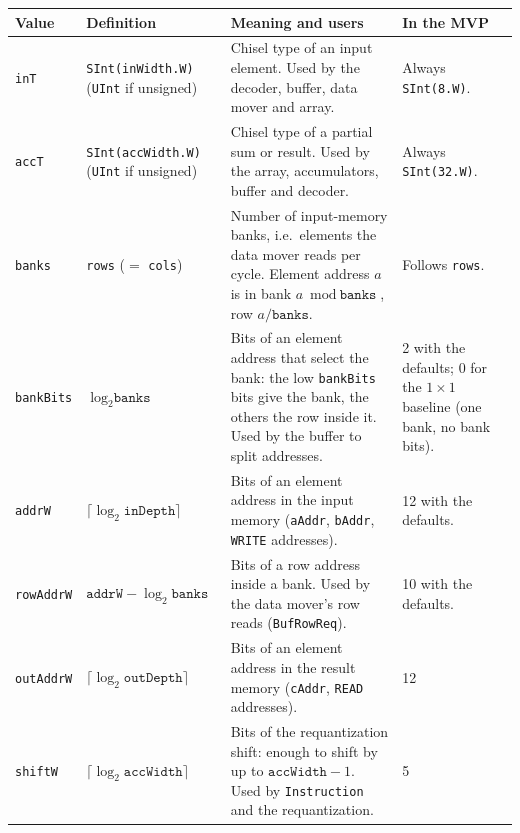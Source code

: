 \documentclass{article}
\begin{document}
\begin{table}[htbp]
\small\renewcommand{\arraystretch}{1.25}
\begin{tabularx}{\linewidth}{@{} l >{\raggedright\arraybackslash}p{3.3cm} Y Y @{}}
  \toprule
  \textbf{Value} & \textbf{Definition} & \textbf{Meaning and users} & \textbf{In the MVP} \\
  \midrule
  \texttt{inT}  & \texttt{SInt(inWidth.W)} (\texttt{UInt} if unsigned)
                & Chisel type of an input element. Used by the decoder, buffer, data mover and array.
                & Always \texttt{SInt(8.W)}. \\
  \texttt{accT} & \texttt{SInt(accWidth.W)} (\texttt{UInt} if unsigned)
                & Chisel type of a partial sum or result. Used by the array, accumulators, buffer and decoder.
                & Always \texttt{SInt(32.W)}. \\
  \texttt{banks} & \texttt{rows} ($=$ \texttt{cols})
                & Number of input-memory banks, i.e.\ elements the data mover reads per cycle. Element address $a$ is in bank $a \bmod \texttt{banks}$, row $a / \texttt{banks}$.
                & Follows \texttt{rows}. \\
\texttt{bankBits} & $\log_2 \texttt{banks}$
                & Bits of an element address that select the bank: the low \texttt{bankBits} bits give the bank,
                  the others the row inside it. Used by the buffer to split addresses.
                & 2 with the defaults; 0 for the $1\times1$ baseline (one bank, no bank bits). \\
  \texttt{addrW} & $\lceil\log_2 \texttt{inDepth}\rceil$
                & Bits of an element address in the input memory (\texttt{aAddr}, \texttt{bAddr}, \texttt{WRITE} addresses).
                & 12 with the defaults. \\
  \texttt{rowAddrW} & $\texttt{addrW} - \log_2 \texttt{banks}$
                & Bits of a row address inside a bank. Used by the data mover's row reads (\texttt{BufRowReq}).
                & 10 with the defaults. \\
\texttt{outAddrW} & $\lceil\log_2 \texttt{outDepth}\rceil$
                & Bits of an element address in the result memory (\texttt{cAddr}, \texttt{READ} addresses).
                & 12 \\
  \texttt{shiftW} & $\lceil\log_2 \texttt{accWidth}\rceil$
                & Bits of the requantization shift: enough to shift by up to $\texttt{accWidth}-1$.
                  Used by \texttt{Instruction} and the requantization.
                & 5 \\

\end{tabularx}
\end{table}
\end{document}
